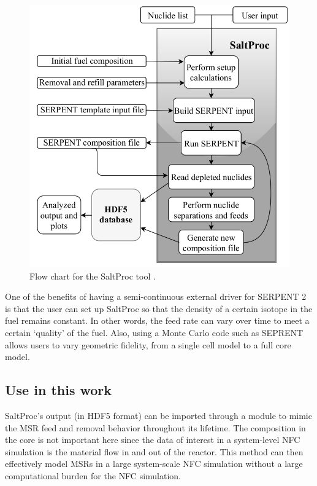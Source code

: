 \begin{figure}[htbp!]
	\begin{center}
		\includegraphics[scale=0.5]{./images/saltproc.png}
	\end{center}
	\caption{Flow chart for the SaltProc tool
		\cite{rykhlevskii_online_2017}.}
	\label{fig:SaltProc}
\end{figure}


One of the benefits of having a semi-continuous external driver for
SERPENT 2 is that the user can set up SaltProc so that the density
of a certain isotope in the fuel remains constant. In other words,
the feed rate can vary over time to meet a certain `quality' of the fuel.
Also, using a Monte Carlo code such as SEPRENT allows users to vary
geometric fidelity, from a single cell model to a full core model.

\subsection{Use in this work}
SaltProc's output (in HDF5 \cite{the_hdf_group_hierarchical_1997} format) can be imported through a \Cyclus
module to mimic the \gls{MSR} feed and removal
behavior throughout its lifetime. The composition in the core is
not important here since the data of interest in a system-level \gls{NFC} simulation
is the material flow in and out of the reactor. This method can
then effectively model \glspl{MSR} in a large system-scale \gls{NFC}
simulation without a large computational burden for the \gls{NFC} simulation.